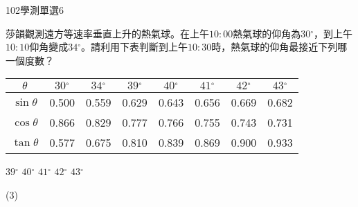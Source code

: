     \begin{QUESTION}
        \begin{ExamInfo}{102}{學測}{單選}{6}
        \end{ExamInfo}
        \begin{ExamAnsRateInfo}{39}{71}{31}{15}
        \end{ExamAnsRateInfo}
        \begin{QBODY}
            莎韻觀測遠方等速率垂直上升的熱氣球。在上午$10:00$熱氣球的仰角為$30{}^\circ $，到上午$10:10$仰角變成$34{}^\circ $。請利用下表判斷到上午$10:30$時，熱氣球的仰角最接近下列哪一個度數？
			\begin{tabular}{|c|c|c|c|c|c|c|c|}
			\hline
			$\theta $		& $30{}^\circ $ & $34{}^\circ $ & 	$39{}^\circ $	&  $40{}^\circ $   & $41{}^\circ $ & $42{}^\circ $	& $43{}^\circ $  \\\hline
			$\sin \theta $	& 0.500	        &    0.559	    &       0.629	    &     0.643	       &   0.656	   &       0.669	&      0.682     \\\hline
			$\cos \theta $	& 0.866	        &    0.829	    &       0.777	    &     0.766	       &   0.755	   &       0.743	&      0.731     \\\hline
			$\tan \theta $	& 0.577	        &    0.675	    &       0.810	    &     0.839	       &   0.869	   &       0.900	&      0.933     \\\hline
			\end{tabular}
			\begin{QOPS}
				\QOP $39{}^\circ $
				\QOP $40{}^\circ $
				\QOP $41{}^\circ $
				\QOP $42{}^\circ $
				\QOP $43{}^\circ $
			\end{QOPS}
        \end{QBODY}
        \begin{QFROMS}
        \end{QFROMS}
        \begin{QTAGS}\end{QTAGS}
        \begin{QANS}
            (3)
        \end{QANS}
        \begin{QSOLLIST}
        \end{QSOLLIST}
        \begin{QEMPTYSPACE}
        \end{QEMPTYSPACE}
    \end{QUESTION}
